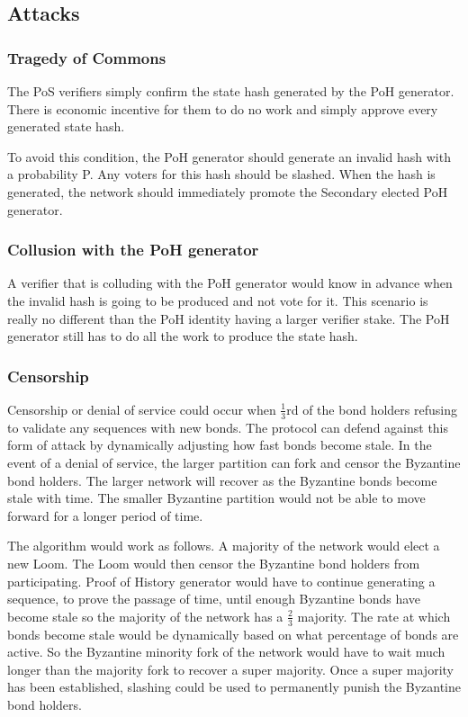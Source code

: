 \documentclass[12pt]{article}
\begin{document}
\subsection{Attacks}
\subsubsection{Tragedy of Commons}

The PoS verifiers simply confirm the state hash generated by the PoH generator. There is economic incentive for them to do no work and simply approve every generated state hash. 

To avoid this condition, the PoH generator should generate an invalid hash with a probability P. Any voters for this hash should be slashed. When the hash is generated, the network should immediately promote the Secondary elected PoH generator.

\subsubsection{Collusion with the PoH generator}\label{subsubsec:collusion}
A verifier that is colluding with the PoH generator would know in advance when the invalid hash is going to be produced and not vote for it. This scenario is really no different than the PoH identity having a larger verifier stake. The PoH generator still has to do all the work to produce the state hash.
\subsubsection{Censorship}\label{censorship}
Censorship or denial of service could occur when \(\frac{1}{3}\)rd of the bond holders refusing to validate any sequences with new bonds. The protocol can defend against this form of attack by dynamically adjusting how fast bonds become stale. In the event of a denial of service, the larger partition can fork and censor the Byzantine bond holders. The larger network will recover as the Byzantine bonds become stale with time. The smaller Byzantine partition would not be able to move forward for a longer period of time. 

The algorithm would work as follows.  A majority of the network would elect a new Loom.  The Loom would then censor the Byzantine bond holders from participating.  Proof of History generator would have to continue generating a sequence, to prove the passage of time, until enough Byzantine bonds have become stale so the majority of the network has a \(\frac{2}{3}\) majority.  The rate at which bonds become stale would be dynamically based on what percentage of bonds are active.  So the Byzantine minority fork of the network would have to wait much longer than the majority fork to recover a super majority.  Once a super majority has been established, slashing could be used to permanently punish the Byzantine bond holders.
\end{document}
